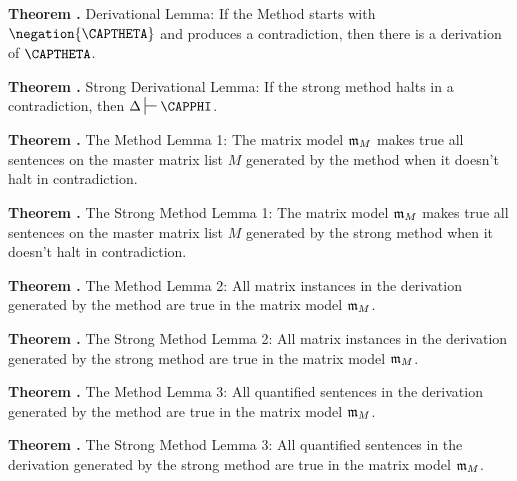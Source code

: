 \begin{majorILnc}{\textbf{Theorem .} Derivational Lemma:}
If the Method starts with $\negation{\CAPTHETA}$ and produces a contradiction, then there is a derivation of $\CAPTHETA$.
\end{majorILnc}

\begin{majorILnc}{\textbf{Theorem .} Strong Derivational Lemma:}
If the strong method halts in a contradiction, then $\Delta\sststile{}{}\CAPPHI$.
\end{majorILnc}

\begin{majorILnc}{\textbf{Theorem .} The Method Lemma 1:}
The matrix model $\mathfrak{m}_M$ makes true all sentences on the master matrix list $M$ generated by the method when it doesn't halt in contradiction.
\end{majorILnc}

\begin{majorILnc}{\textbf{Theorem .} The Strong Method Lemma 1:}
The matrix model $\mathfrak{m}_M$ makes true all sentences on the master matrix list $M$ generated by the strong method when it doesn't halt in contradiction.
\end{majorILnc}

\begin{majorILnc}{\textbf{Theorem .} The Method Lemma 2:}
All matrix instances in the derivation generated by the method are true in the matrix model $\mathfrak{m}_M$.
\end{majorILnc}

\begin{majorILnc}{\textbf{Theorem .} The Strong Method Lemma 2:}
All matrix instances in the derivation generated by the strong method are true in the matrix model $\mathfrak{m}_M$.
\end{majorILnc}

\begin{majorILnc}{\textbf{Theorem .} The Method Lemma 3:}
All quantified sentences in the derivation generated by the method are true in the matrix model $\mathfrak{m}_M$.
\end{majorILnc}

\begin{majorILnc}{\textbf{Theorem .} The Strong Method Lemma 3:}
All quantified sentences in the derivation generated by the strong method are true in the matrix model $\mathfrak{m}_M$.
\end{majorILnc}


